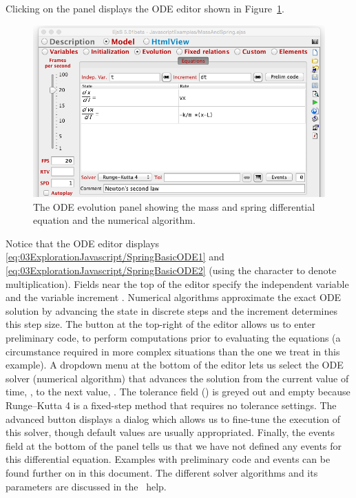 Clicking on the  panel displays the ODE editor shown in
Figure~\ref{fig:03ExplorationJavascript/ModelEvolution}.
\begin{figure}[htb]
    \centering
  \includegraphics[scale=\scale]{03ExplorationJavascript/images/ModelEvolution.png}
    \caption{The ODE evolution panel showing the mass and spring differential equation and the numerical algorithm.}
    \label{fig:03ExplorationJavascript/ModelEvolution}
\end{figure}
Notice that the ODE editor displays \eqref{eq:03ExplorationJavascript/SpringBasicODE1} and \eqref{eq:03ExplorationJavascript/SpringBasicODE2}
(using the  \lit{*} character to denote multiplication). Fields near the top of the editor specify the independent variable
 and the variable increment .  Numerical algorithms approximate the exact ODE solution by advancing
the state in discrete steps and the increment determines this step size.
The  button at the top-right of the editor allows us to enter preliminary code, to perform computations prior to evaluating the equations (a circumstance required in more complex situations than the one we treat in this example). A dropdown menu at the bottom of the editor
lets us select the ODE solver (numerical algorithm) that advances the solution from the current value of time, , to the next value, . The tolerance field () is greyed out and empty because Runge--Kutta 4 is a fixed-step method that requires no tolerance settings. The advanced button displays a dialog which allows us to fine-tune the execution of this solver, though default values are usually appropriated. Finally, the events field at the bottom of the panel tells us that we have not defined any events for this differential equation. Examples with preliminary code and events can be found further on in this document. The different solver algorithms and its parameters are discussed in the \ejs\ help.

